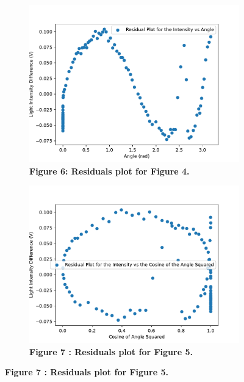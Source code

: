 \documentclass[
	letterpaper, %
	10pt, %
]{CSUniSchoolLabReport}
\begin{document}
\begin{figure}[H]
\begin{subfigure}{0.45\textwidth}
	\end{subfigure}
	\begin{subfigure}{0.45\textwidth}
		\centering
		\includegraphics[width=\textwidth]{../figures/figure6.pdf}
		\caption{\textbf{Figure 6: Residuals plot for Figure 4.}}
	\end{subfigure}
	\hfill
	\begin{subfigure}{0.45\textwidth}
		\includegraphics[width=\textwidth]{../figures/figure7.pdf}
		\caption{\textbf{Figure 7 : Residuals plot for Figure 5.}}
	\end{subfigure}
\end{figure}
\end{document}
